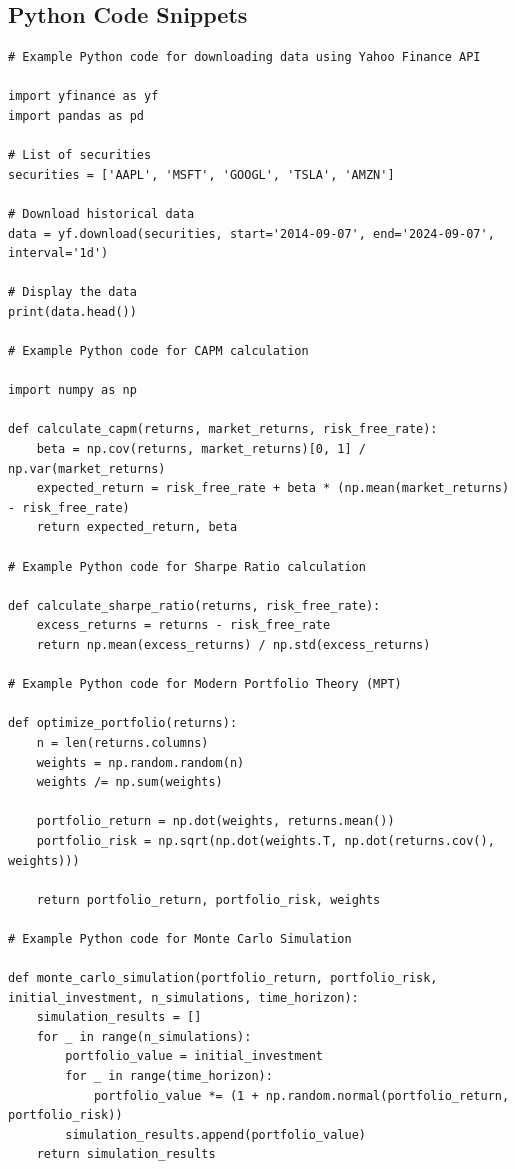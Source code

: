 \subsection*{Python Code Snippets}
\begin{verbatim}
# Example Python code for downloading data using Yahoo Finance API

import yfinance as yf
import pandas as pd

# List of securities
securities = ['AAPL', 'MSFT', 'GOOGL', 'TSLA', 'AMZN']

# Download historical data
data = yf.download(securities, start='2014-09-07', end='2024-09-07', interval='1d')

# Display the data
print(data.head())

# Example Python code for CAPM calculation

import numpy as np

def calculate_capm(returns, market_returns, risk_free_rate):
    beta = np.cov(returns, market_returns)[0, 1] / np.var(market_returns)
    expected_return = risk_free_rate + beta * (np.mean(market_returns) - risk_free_rate)
    return expected_return, beta

# Example Python code for Sharpe Ratio calculation

def calculate_sharpe_ratio(returns, risk_free_rate):
    excess_returns = returns - risk_free_rate
    return np.mean(excess_returns) / np.std(excess_returns)

# Example Python code for Modern Portfolio Theory (MPT)

def optimize_portfolio(returns):
    n = len(returns.columns)
    weights = np.random.random(n)
    weights /= np.sum(weights)
    
    portfolio_return = np.dot(weights, returns.mean())
    portfolio_risk = np.sqrt(np.dot(weights.T, np.dot(returns.cov(), weights)))
    
    return portfolio_return, portfolio_risk, weights

# Example Python code for Monte Carlo Simulation

def monte_carlo_simulation(portfolio_return, portfolio_risk, initial_investment, n_simulations, time_horizon):
    simulation_results = []
    for _ in range(n_simulations):
        portfolio_value = initial_investment
        for _ in range(time_horizon):
            portfolio_value *= (1 + np.random.normal(portfolio_return, portfolio_risk))
        simulation_results.append(portfolio_value)
    return simulation_results
\end{verbatim}
